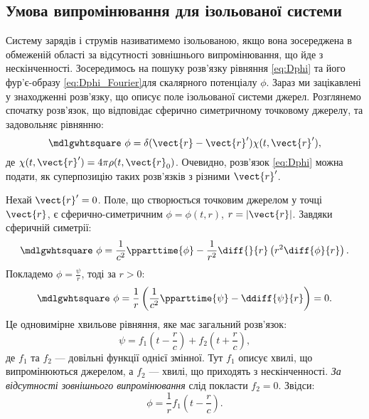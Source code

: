 \subsection*{Умова випромінювання для ізольованої системи}


Систему зарядів і струмів називатимемо ізольованою, якщо вона зосереджена в обмеженій області за відсутності зовнішнього випромінювання, що йде з
нескінченності. Зосередимось на пошуку розв’язку рівняння \eqref{eq:Dphi} та його фур’є-образу \eqref{eq:Dphi_Fourier}для скалярного потенціалу $\phi$.
Зараз ми зацікавлені у знаходженні розв’язку, що описує поле ізольованої системи джерел. Розглянемо спочатку розв’язок, що відповідає сферично
симетричному точковому джерелу, та задовольняє рівнянню:
\begin{equation*}
	\mdlgwhtsquare\ \phi = \delta(\vect{r} - \vect{r}')\chi(t, \vect{r}'),
\end{equation*}
де $\chi(t, \vect{r}') = 4\pi\rho(t, \vect{r}_0)$. Очевидно, розв’язок \eqref{eq:Dphi} можна подати, як суперпозицію
таких розв’язків з різними $\vect{r}'$.

Нехай $\vect{r}' = 0$. Поле, що створюється точковим джерелом у точці $\vect{r}$, є сферично-симетричним $\phi = \phi(t, r)$, $r = |\vect{r}|$. Завдяки
сферичній симетрії:
\begin{equation*}
	\mdlgwhtsquare\ \phi = \frac1{c^2}\pparttime{\phi} - \frac1{r^2} \diff{}{r}\left(r^2 \diff{\phi}{r} \right) .
\end{equation*}
Покладемо $\phi = \frac{\psi}{r}$, тоді за $r>0$:
\begin{equation*}
	\mdlgwhtsquare\ \phi = \frac1r \left( \frac1{c^2}\pparttime{\psi} - \ddiff{\psi}{r}\right) =0 .
\end{equation*}
Це одновимірне хвильове рівняння, яке має загальний розв’язок:
\begin{equation*}
	\psi = f_1\left( t - \frac{r}c \right) + f_2\left( t + \frac{r}c \right),
\end{equation*}
де $f_1$ та $f_2$ --- довільні функції однієї змінної. Тут $f_1$ описує хвилі, що
випромінюються джерелом, а $f_2$ --- хвилі, що приходять з нескінченності. \emph{За
	відсутності зовнішнього випромінювання} слід покласти $f_2=0$. Звідси:
\begin{equation*}
	\phi = \frac1r f_1\left( t - \frac{r}c \right).
\end{equation*}

